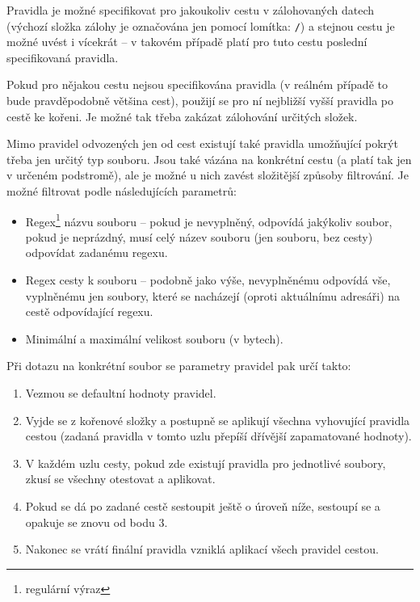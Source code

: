 Pravidla je možné specifikovat pro jakoukoliv cestu v zálohovaných datech
(výchozí složka zálohy je označována jen pomocí lomítka: \texttt{/}) a stejnou
cestu je možné uvést i vícekrát -- v takovém případě platí pro tuto cestu
poslední specifikovaná pravidla.

Pokud pro nějakou cestu nejsou specifikována pravidla (v reálném případě to bude
pravděpodobně většina cest), použijí se pro ní nejbližší vyšší pravidla po cestě
ke kořeni. Je možné tak třeba zakázat zálohování určitých složek.

Mimo pravidel odvozených jen od cest existují také pravidla umožňující pokrýt
třeba jen určitý typ souboru. Jsou také vázána na konkrétní cestu (a platí tak
jen v určeném podstromě), ale je možné u nich zavést složitější způsoby
filtrování. Je možné filtrovat podle následujících parametrů:

\begin{itemize}
	\item Regex\footnote{regulární výraz} názvu souboru -- pokud je nevyplněný,
	odpovídá jakýkoliv soubor, pokud je neprázdný, musí celý název souboru
	(jen souboru, bez cesty) odpovídat zadanému regexu.
	\item Regex cesty k souboru -- podobně jako výše, nevyplněnému odpovídá vše,
	vyplněnému jen soubory, které se nacházejí (oproti aktuálnímu adresáři)
	na cestě odpovídající regexu.
	\item Minimální a maximální velikost souboru (v bytech).
\end{itemize}

\noindent Při dotazu na konkrétní soubor se parametry pravidel pak určí takto:
\begin{enumerate}
	\item Vezmou se defaultní hodnoty pravidel.
	\item Vyjde se z kořenové složky a postupně se aplikují všechna
	vyhovující pravidla cestou (zadaná pravidla v tomto uzlu přepíší
	dřívější zapamatované hodnoty).
	\item V každém uzlu cesty, pokud zde existují pravidla pro jednotlivé
	soubory, zkusí se všechny otestovat a aplikovat.
	\item Pokud se dá po zadané cestě sestoupit ještě o úroveň níže, sestoupí
	se a opakuje se znovu od bodu 3.
	\item Nakonec se vrátí finální pravidla vzniklá aplikací všech pravidel
	cestou.
\end{enumerate}

